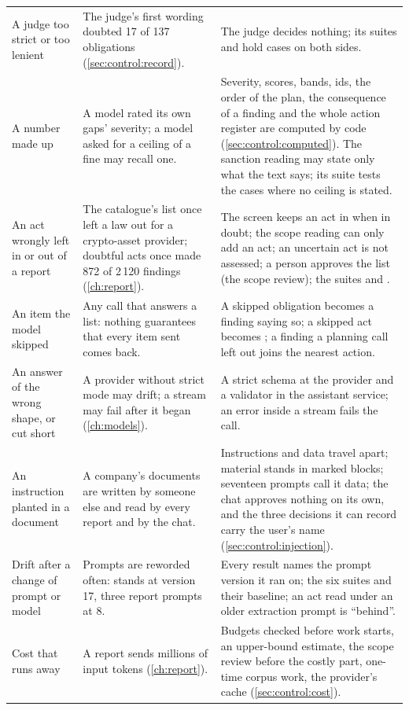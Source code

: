 \begin{xltabular}{\textwidth}{@{}L{34mm}YL{50mm}@{}}
A judge too strict or too lenient & The judge's first wording doubted 17 of 137 obligations (\cref{sec:control:record}). & The judge decides nothing; its suites  and  hold cases on both sides. \\
A number made up & A model rated its own gaps' severity; a model asked for a ceiling of a fine may recall one. & Severity, scores, bands, ids, the order of the plan, the consequence of a finding and the whole action register are computed by code (\cref{sec:control:computed}). The sanction reading may state only what the text says; its suite tests the cases where no ceiling is stated. \\
An act wrongly left in or out of a report & The catalogue's list once left a law out for a crypto-asset provider; doubtful acts once made 872 of 2\,120 findings (\cref{ch:report}). & The screen keeps an act in when in doubt; the scope reading can only add an act; an uncertain act is not assessed; a person approves the list (the scope review); the suites  and . \\
An item the model skipped & Any call that answers a list: nothing guarantees that every item sent comes back. & A skipped obligation becomes a  finding saying so; a skipped act becomes ; a finding a planning call left out joins the nearest action. \\
An answer of the wrong shape, or cut short & A provider without strict mode may drift; a stream may fail after it began (\cref{ch:models}). & A strict schema at the provider and a validator in the assistant service; an error inside a stream fails the call. \\
An instruction planted in a document & A company's documents are written by someone else and read by every report and by the chat. & Instructions and data travel apart; material stands in marked blocks; seventeen prompts call it data; the chat approves nothing on its own, and the three decisions it can record carry the user's name (\cref{sec:control:injection}). \\
Drift after a change of prompt or model & Prompts are reworded often:  stands at version 17, three report prompts at 8. & Every result names the prompt version it ran on; the six suites and their baseline; an act read under an older extraction prompt is \enquote{behind}. \\
Cost that runs away & A report sends millions of input tokens (\cref{ch:report}). & Budgets checked before work starts, an upper-bound estimate, the scope review before the costly part, one-time corpus work, the provider's cache (\cref{sec:control:cost}). \\
\end{xltabular}


